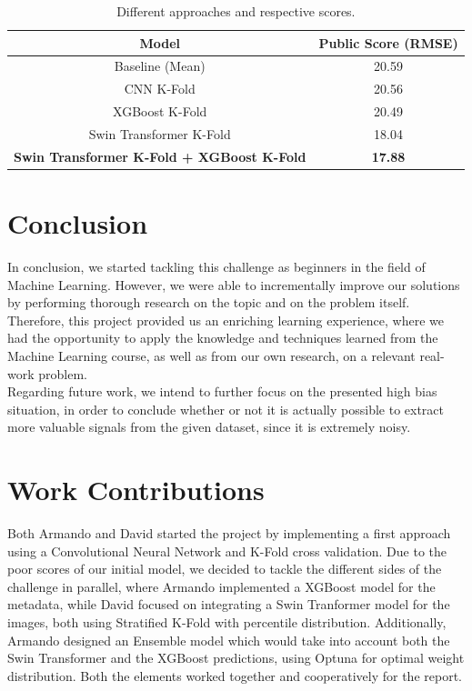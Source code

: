 \documentclass{article}
\begin{document}
\begin{table}[h!]
\centering
\setlength{\extrarowheight}{3pt}
\begin{tabular}{|c|c|}
    \hline
    \textbf{Model} & \textbf{Public Score} (RMSE)\\
    \hline
    Baseline (Mean) & 20.59\\
    \hline
    CNN K-Fold & 20.56\\
    \hline
    XGBoost K-Fold & 20.49\\
    \hline
    Swin Transformer K-Fold & 18.04\\
    \hline
    \textbf{Swin Transformer K-Fold + XGBoost K-Fold} & \textbf{17.88}\\
    \hline
\end{tabular}
\vspace{0.3cm}
\caption{Different approaches and respective scores.}
\label{tab:score}
\end{table}

\section{Conclusion}
In conclusion, we started tackling this challenge as beginners in the field of Machine Learning. However, we were able to incrementally improve our solutions by performing thorough research on the topic and on the problem itself. Therefore, this project provided us an enriching learning experience, where we had the opportunity to apply the knowledge and techniques learned from the Machine Learning course, as well as from our own research, on a relevant real-work problem.\\
Regarding future work, we intend to further focus on the presented high bias situation, in order to conclude whether or not it is actually possible to extract more valuable signals from the given dataset, since it is extremely noisy.

\section{Work Contributions}
Both Armando and David started the project by implementing a first approach using a Convolutional Neural Network and K-Fold cross validation. Due to the poor scores of our initial model, we decided to tackle the different sides of the challenge in parallel, where Armando implemented a XGBoost model for the metadata, while David focused on integrating a Swin Tranformer model for the images, both using Stratified K-Fold with percentile distribution. Additionally, Armando designed an Ensemble model which would take into account both the Swin Transformer and the XGBoost predictions, using Optuna for optimal weight distribution. Both the elements worked together and cooperatively for the report.

\small
\printbibliography
\end{document}
